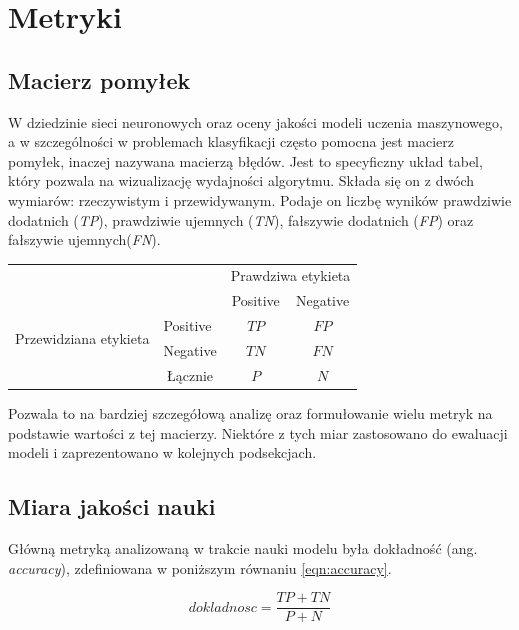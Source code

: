 \section{Metryki}

\subsection{Macierz pomyłek}

W dziedzinie sieci neuronowych oraz oceny jakości modeli uczenia maszynowego, a w szczególności w problemach klasyfikacji często pomocna jest macierz pomyłek, inaczej nazywana macierzą błędów. Jest to specyficzny układ tabel, który pozwala na wizualizację wydajności algorytmu. Składa się on z dwóch wymiarów: rzeczywistym i przewidywanym. Podaje on liczbę wyników prawdziwie dodatnich (\textit{TP}), prawdziwie ujemnych (\textit{TN}), fałszywie dodatnich (\textit{FP}) oraz fałszywie ujemnych(\textit{FN}).

\begin{table}[ht]
\label{tab:tabela_matrix}
\centering\footnotesize%
\begin{tabular}{l|l|c|c|}
\multicolumn{2}{c}{}&\multicolumn{2}{c}{Prawdziwa etykieta}\\
\cline{3-4}
\multicolumn{2}{c|}{}&Positive&Negative\\
\cline{2-4}
\multirow{2}{*}{Przewidziana etykieta} & Positive & $TP$ & $FP$\\
\cline{2-4}
& Negative & $TN$ & $FN$\\
\cline{2-4}
\multicolumn{1}{c}{} & \multicolumn{1}{c}{Łącznie} & \multicolumn{1}{c}{$P$} & \multicolumn{1}{c}{$N$}\\
\end{tabular}
\end{table}

Pozwala to na bardziej szczegółową analizę oraz formułowanie wielu metryk na podstawie wartości z tej macierzy. Niektóre z tych miar zastosowano do ewaluacji modeli i zaprezentowano w kolejnych podsekcjach.

\subsection{Miara jakości nauki}

Główną metryką analizowaną w trakcie nauki modelu była dokładność (ang. \textit{accuracy}), zdefiniowana w poniższym równaniu \ref{eqn:accuracy}.

\begin{equation}
\label{eqn:accuracy}
dokladnosc=\frac{TP + TN}{P + N}
\end{equation}

